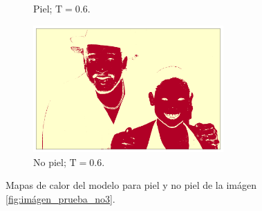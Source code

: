 \begin{figure}[ht!]
\begin{subfigure}{0.4\textwidth}
        \caption{Piel; $\text{T} = 0.6$.}
    \end{subfigure}
    \hspace{1cm}
    \begin{subfigure}{0.4\textwidth}
        \centering
        \includegraphics[width=0.8\textwidth]{../figures/image3/image_03_treshbg_60percent.png}
        \caption{No piel; $\text{T} = 0.6$.}
    \end{subfigure}
    \caption{Mapas de calor del modelo para piel y no piel de la imágen \cref{fig:imágen_prueba_no3}.}
    \label{fig:model_applied_no3}
\end{figure}

